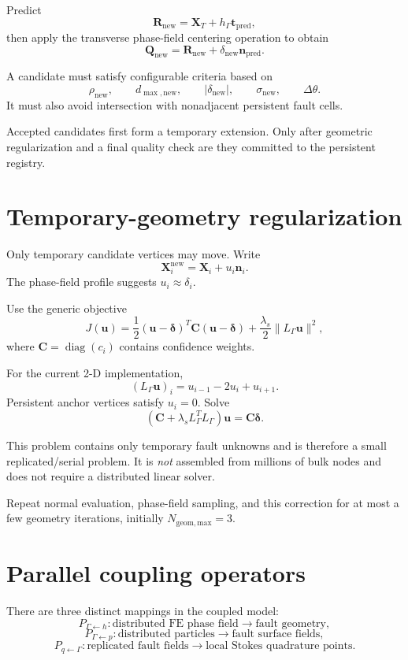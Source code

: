 \documentclass[11pt]{article}
\begin{document}
Predict
\[
\mathbf{R}_{\mathrm{new}}
=
\mathbf{X}_T+h_\Gamma\mathbf{t}_{\mathrm{pred}},
\]
then apply the transverse phase-field centering operation to obtain
\[
\mathbf{Q}_{\mathrm{new}}
=
\mathbf{R}_{\mathrm{new}}+\delta_{\mathrm{new}}\mathbf{n}_{\mathrm{pred}}.
\]

A candidate must satisfy configurable criteria based on
\[
\rho_{\mathrm{new}},\qquad d_{\max,\mathrm{new}},\qquad
|\delta_{\mathrm{new}}|,\qquad\sigma_{\mathrm{new}},\qquad
\Delta\theta.
\]
It must also avoid intersection with nonadjacent persistent fault cells.

Accepted candidates first form a temporary extension.  Only after geometric regularization and a final quality check are they committed to the persistent registry.

\section{Temporary-geometry regularization}

Only temporary candidate vertices may move.  Write
\[
\mathbf{X}_i^{\mathrm{new}}
=
\mathbf{X}_i+u_i\mathbf{n}_i.
\]
The phase-field profile suggests $u_i\approx\delta_i$.

Use the generic objective
\[
J(\mathbf{u})
=
\frac12(\mathbf{u}-\boldsymbol\delta)^T\mathbf{C}
(\mathbf{u}-\boldsymbol\delta)
+
\frac{\lambda_s}{2}\|L_\Gamma\mathbf{u}\|^2,
\]
where $\mathbf{C}=\operatorname{diag}(c_i)$ contains confidence weights.

For the current 2-D implementation,
\[
(L_\Gamma\mathbf{u})_i
=u_{i-1}-2u_i+u_{i+1}.
\]
Persistent anchor vertices satisfy $u_i=0$.  Solve
\[
\boxed{
(\mathbf{C}+\lambda_sL_\Gamma^TL_\Gamma)\mathbf{u}
=
\mathbf{C}\boldsymbol\delta.
}
\]

This problem contains only temporary fault unknowns and is therefore a small replicated/serial problem.  It is \emph{not} assembled from millions of bulk nodes and does not require a distributed linear solver.

Repeat normal evaluation, phase-field sampling, and this correction for at most a few geometry iterations, initially $N_{\mathrm{geom,max}}=3$.

\section{Parallel coupling operators}

There are three distinct mappings in the coupled model:
\[
P_{\Gamma\leftarrow h}:
\text{distributed FE phase field}\rightarrow\text{fault geometry},
\]
\[
P_{\Gamma\leftarrow p}:
\text{distributed particles}\rightarrow\text{fault surface fields},
\]
\[
P_{q\leftarrow\Gamma}:
\text{replicated fault fields}\rightarrow\text{local Stokes quadrature points}.
\]
\end{document}

